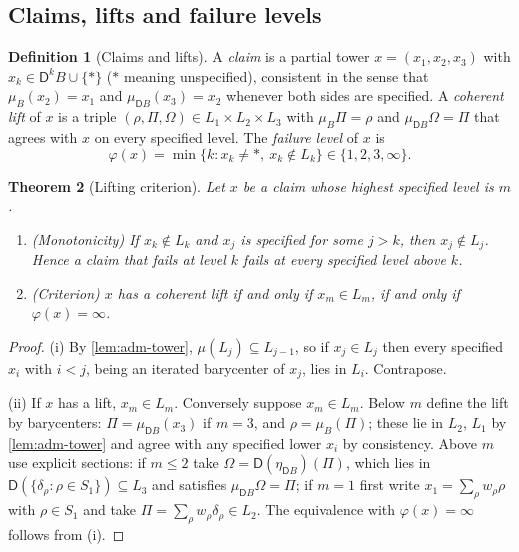 \documentclass[11pt]{article}
\newtheorem{theorem}{Theorem}[section]
\theoremstyle{definition}
\newtheorem{definition}[theorem]{Definition}
\theoremstyle{remark}
\newcommand{\D}{\mathsf{D}}
\begin{document}
\subsection{Claims, lifts and failure levels}

\begin{definition}[Claims and lifts]
A \emph{claim} is a partial tower $x=(x_1,x_2,x_3)$ with $x_k\in\D^kB\cup\{\ast\}$ ($\ast$ meaning
unspecified), consistent in the sense that $\mu_B(x_2)=x_1$ and $\mu_{\D B}(x_3)=x_2$ whenever both
sides are specified. A \emph{coherent lift} of $x$ is a triple $(\rho,\Pi,\Omega)\in L_1\times L_2\times
L_3$ with $\mu_B\Pi=\rho$ and $\mu_{\D B}\Omega=\Pi$ that agrees with $x$ on every specified level.
The \emph{failure level} of $x$ is
\[
\varphi(x)=\min\{k: x_k\neq\ast,\ x_k\notin L_k\}\in\{1,2,3,\infty\}.
\]
\end{definition}

\begin{theorem}[Lifting criterion]\label{thm:lifting}
Let $x$ be a claim whose highest specified level is $m$.
\begin{enumerate}[label=(\roman*)]
\item (Monotonicity) If $x_k\notin L_k$ and $x_j$ is specified for some $j>k$, then $x_j\notin L_j$.
  Hence a claim that fails at level $k$ fails at every specified level above $k$.
\item (Criterion) $x$ has a coherent lift if and only if $x_m\in L_m$, if and only if
  $\varphi(x)=\infty$.
\end{enumerate}
\end{theorem}
\begin{proof}
(i) By \cref{lem:adm-tower}, $\mu(L_{j})\subseteq L_{j-1}$, so if $x_j\in L_j$ then every specified
$x_i$ with $i<j$, being an iterated barycenter of $x_j$, lies in $L_i$. Contrapose.

(ii) If $x$ has a lift, $x_m\in L_m$. Conversely suppose $x_m\in L_m$. Below $m$ define the lift by
barycenters: $\Pi=\mu_{\D B}(x_3)$ if $m=3$, and $\rho=\mu_B(\Pi)$; these lie in $L_2$, $L_1$ by
\cref{lem:adm-tower} and agree with any specified lower $x_i$ by consistency. Above $m$ use
explicit sections: if $m\le2$ take $\Omega=\D(\eta_{\D B})(\Pi)$, which lies in $\D(\{\delta_\rho:
\rho\in S_1\})\subseteq L_3$ and satisfies $\mu_{\D B}\Omega=\Pi$; if $m=1$ first write
$x_1=\sum_\rho w_\rho\rho$ with $\rho\in S_1$ and take $\Pi=\sum_\rho w_\rho\delta_\rho\in L_2$. The
equivalence with $\varphi(x)=\infty$ follows from (i).
\end{proof}
\end{document}
